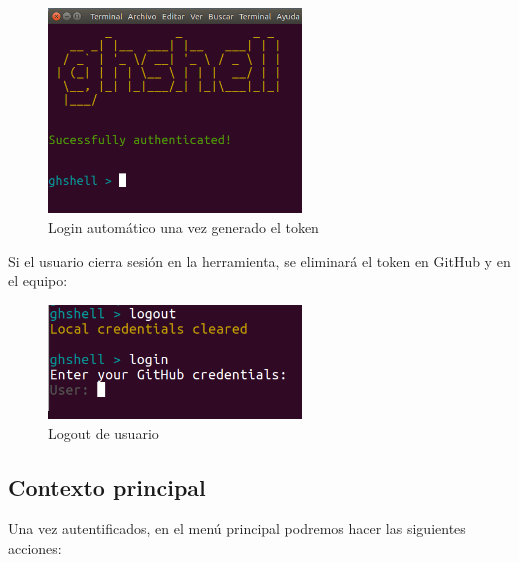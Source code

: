 		\begin{figure}[H]
		\begin{center}
		\includegraphics[width=0.6\textwidth]{images/ghshell2-4}
		\caption{Login automático una vez generado el token}
		\label{fig:ghshell2-4}
		\end{center}
		\end{figure}
		
	Si el usuario cierra sesión en la herramienta, se eliminará el token en GitHub y en el equipo:
	
		\begin{figure}[H]
		\begin{center}
		\includegraphics[width=0.6\textwidth]{images/ghshell2-2}
		\caption{Logout de usuario}
		\label{fig:ghshell2-2}
		\end{center}
		\end{figure}
		
\newpage

\subsection{Contexto principal}
\label{subsec:b.2.2}

	Una vez autentificados, en el menú principal podremos hacer las siguientes acciones:
	
